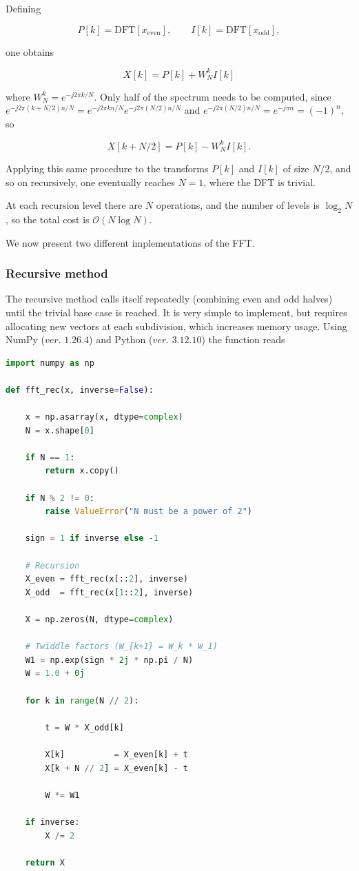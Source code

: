 \documentclass[11pt,a4paper,twoside,pdf]{article}
\numberwithin{equation}{section}
\begin{document}
Defining

$$
    P[k] = \mathrm{DFT}[x_{\text{even}}], \qquad I[k] = \mathrm{DFT}[x_{\text{odd}}],
$$


one obtains

$$
    X[k]=P[k]+W^k_N I[k]
$$

where $W_N^k = e^{-j2\pi k/N}$. Only half of the spectrum needs to be computed, since $e^{-j2\pi (k+N/2)n/N} = e^{-j2\pi kn/N} e^{-j2\pi (N/2)n/N}$ and $e^{-j2\pi (N/2)n/N} = e^{-j\pi n} = (-1)^n$, so

$$
    X[k + N/2] = P[k] - W^k_N I[k].
$$


Applying this same procedure to the transforms $P[k]$ and $I[k]$ of size $N/2$, and so on recursively, one eventually reaches $N=1$, where the DFT is trivial.

At each recursion level there are $N$ operations, and the number of levels is $\log_2 N$, so the total cost is $\mathcal{O}(N\log N)$.

We now present two different implementations of the FFT.



\subsubsection{Recursive method}


The recursive method calls itself repeatedly (combining even and odd halves) until the trivial base case is reached. It is very simple to implement, but requires allocating new vectors at each subdivision, which increases memory usage. Using NumPy ($ver.$ $1.26.4$) \cite{harris2020array} and Python ($ver.$ $3.12.10$) the function reads\\



\begin{lstlisting}[language=Python, caption = Recursive FFT implementation.]
import numpy as np

def fft_rec(x, inverse=False):

    x = np.asarray(x, dtype=complex)
    N = x.shape[0]

    if N == 1:
        return x.copy()

    if N % 2 != 0:
        raise ValueError("N must be a power of 2")

    sign = 1 if inverse else -1

    # Recursion
    X_even = fft_rec(x[::2], inverse)
    X_odd  = fft_rec(x[1::2], inverse)

    X = np.zeros(N, dtype=complex)

    # Twiddle factors (W_{k+1} = W_k * W_1)
    W1 = np.exp(sign * 2j * np.pi / N)
    W = 1.0 + 0j

    for k in range(N // 2):

        t = W * X_odd[k]

        X[k]          = X_even[k] + t
        X[k + N // 2] = X_even[k] - t

        W *= W1

    if inverse:
        X /= 2

    return X
\end{lstlisting}
\end{document}
